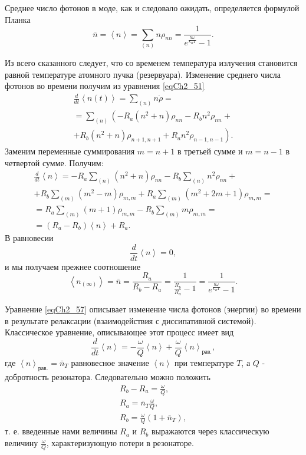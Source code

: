 Среднее число фотонов в моде, как и следовало ожидать, определяется
формулой Планка 
\begin{equation}
\bar{n} = \left<n\right> = 
\sum_{(n)} n \rho_{nn} = 
\frac{1}{ e^{\frac{\hbar \omega}{k_B T}} - 1}.
\end{equation}

Из всего сказанного следует, что со временем температура излучения
становится равной температуре атомного пучка (резервуара).  
Изменение среднего числа фотонов во времени получим из уравнения 
\eqref{eqCh2_51}
\begin{eqnarray}
\frac{d}{d t}\left<n\left(t\right)\right> = \sum_{(n)}n \dot{\rho} = 
\nonumber \\
= \sum_{(n)}\left(-R_a\left(n^2 + n\right)\rho_{nn} - R_b n^2
\rho_{nn} + \right.
\nonumber \\
+ \left.
R_b \left(n^2 + n\right) \rho_{n +1, n+ 1} +
R_a n^2 \rho_{n - 1, n - 1}
\right).
\end{eqnarray}
Заменим переменные суммирования  $m= n + 1$  в третьей сумме и  $m = n
- 1$  в четвертой сумме. Получим:
\begin{eqnarray}
\frac{d}{d t}\left<n\right> = 
-R_a \sum_{(n)}\left(n^2 + n\right)\rho_{nn}
 - R_b \sum_{(n)} n^2 \rho_{nn} +
\nonumber \\
+ R_b\sum_{(m)}\left(m^2 - m\right)\rho_{m,m} 
+ R_a\sum_{(m)}\left(m^2 +2 m + 1\right)\rho_{m,m} = 
\nonumber \\
= R_a \sum_{(m)}\left( m + 1\right)\rho_{m,m} - R_b\sum_{(m)} m
\rho_{m,m} =
\nonumber \\
= \left(R_a - R_b\right) \left<n\right> + R_a.
\label{eqCh2_57}
\end{eqnarray}
В равновесии
\[
\frac{d}{d t}\left<n\right> = 0,
\]  
и мы получаем прежнее соотношение
\begin{equation}
\left<n_{(\infty)}\right> = \bar{n} = 
\frac{R_a}{R_b - R_a} = \frac{1}{\frac{R_b}{R_a} - 1} = 
\frac{1}{e^{\frac{\hbar \omega}{k_B T}} - 1}.
\end{equation}

Уравнение \eqref{eqCh2_57} описывает изменение числа фотонов (энергии)
во времени в результате релаксации (взаимодействия с диссипативной
системой). Классическое уравнение, описывающее этот процесс имеет вид
\begin{equation}
\frac{d}{d t}\left<n\right> = 
- \frac{\omega}{Q}\left<n\right> + \frac{\omega}{Q} \left<n\right>_{\mbox{рав.}},
\nonumber
\end{equation}
где $\left<n\right>_{\mbox{рав.}} = \bar{n}_T$ равновесное значение
$\left<n\right>$ при температуре $T$, а $Q$ - добротность резонатора.
Следовательно можно положить 
\begin{eqnarray}
R_b - R_a = \frac{\omega}{Q},
\nonumber \\
R_a = \bar{n}_T \frac{\omega}{Q},
\nonumber \\
R_b = \frac{\omega}{Q} \left(1 + \bar{n}_T\right),
\label{eqCh2_RabQw}
\end{eqnarray}
т. е. введенные нами величины $R_a$ и $R_b$ выражаются через
классическую величину $\frac{\omega}{Q}$, характеризующую потери в
резонаторе. 

